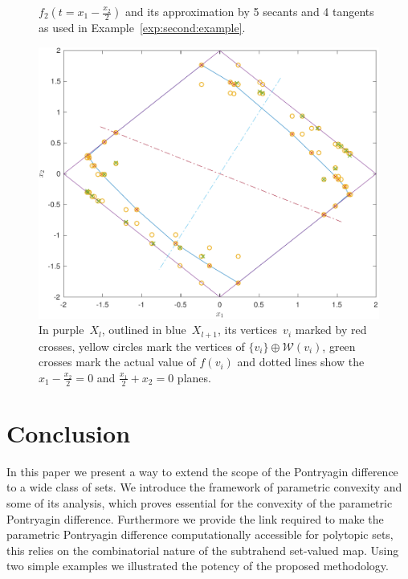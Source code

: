 \documentclass{elsarticle}
\theoremstyle{remark}
\theoremstyle{definition}
\begin{document}
\begin{figure}
\caption{$f_2(t=x_1-\frac{x_2}{2})$ and its approximation by 5 secants and 4 tangents as used in Example~\ref{exp:second:example}.}
\label{fig:approximation:f2:p:diff}
\end{figure}

\begin{figure}
\centering
\includegraphics[width=.95\textwidth]{complexPonDiff.pdf}
\caption{In purple~$X_l$, outlined in blue~$X_{l+1}$, its vertices~$v_i$ marked by red crosses, yellow circles mark the vertices of $\{v_i\}\oplus\mathcal W(v_i)$, green crosses mark the actual value of $f(v_i)$ and dotted lines show the $x_1-\frac{x_2}{2}=0$ and $\frac{x_1}{2}+x_2=0$ planes.}
\label{fig:second:example:resulting:set}
\end{figure}
%
%
%
%
%
\section{Conclusion}\label{sec:conclusion}
%
%
%
In this paper we present a way to extend the scope of the Pontryagin difference to a wide class of sets.
%
We introduce the framework of parametric convexity and some of its analysis, which proves essential for the convexity of the parametric Pontryagin difference.
%
Furthermore we provide the link required to make the parametric Pontryagin difference computationally accessible for polytopic sets, this relies on the combinatorial nature of the subtrahend set-valued map.
%
Using two simple examples we illustrated the potency of the proposed methodology.
\end{document}
